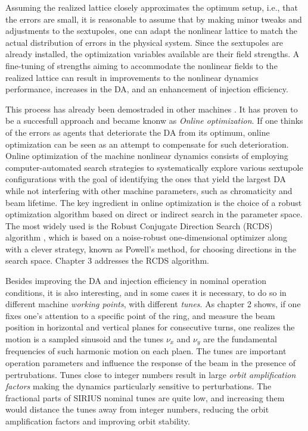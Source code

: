 Assuming the realized lattice closely approximates the optimum setup, i.e., that the errors are small, it is reasonable to assume that by making minor tweaks and adjustments to the sextupoles, one can adapt the nonlinear lattice to match the actual distribution of errors in the physical system. Since the sextupoles are already installed, the optimization variables available are their field strengths. A fine-tuning of strengths aiming to accommodate the nonlinear fields to the realized lattice can result in improvements to the nonlinear dynamics performance, increases in the DA, and an enhancement of injection efficiency.

This process has already been demostraded in other machines \cite{huang_algorithm_2013, huang_online_2015,liuzzo_rcds_2016,olsson_online_2018, yang_online_2022}. It has proven to be a succesfull approach and became knonw as \textit{Online optimization}. If one thinks of the errors as agents that deteriorate the DA from its optimum, online optimization can be seen as an attempt to compensate for such deterioration. Online optimization of the machine nonlinear dynamics consists of employing computer-automated search strategies to systematically explore various sextupole configurations with the goal of identifying the ones that yield the largest DA while not interfering with other machine parameters, such as chromaticity and beam lifetime. The key ingredient in online optimization is the choice of a robust optimization algorithm based on direct or indirect search in the parameter space. The most widely used is the Robust Conjugate Direction Search (RCDS) algorithm \cite{huang_algorithm_2013}, which is based on a noise-robust one-dimensional optimizer along with a clever strategy, known as Powell's method, for choosing directions in the search space. Chapter 3 addresses the RCDS algorithm.

Besides improving the DA and injection efficiency in nominal operation conditions, it is also interesting, and in some cases it is necessary, to do so in different machine \textit{working points}, with different \textit{tunes}. As chapter 2 shows, if one fixes one's attention to a specific point of the ring, and measure the beam position in horizontal and vertical planes for consecutive turns, one realizes the motion is a sampled sinusoid and the tunes $\nu_x$ and $\nu_y$ are the fundamental frequencies of such harmonic motion on each plaen. The tunes are important operation parameters and influence the response of the beam in the presence of pertrubations. Tunes close to integer numbers result in large \textit{orbit amplification factors} making the dynamics particularly sensitive to perturbations. The fractional parts of SIRIUS nominal tunes are quite low, and increasing them would distance the tunes away from integer numbers, reducing the orbit amplification factors and improving orbit stability.

